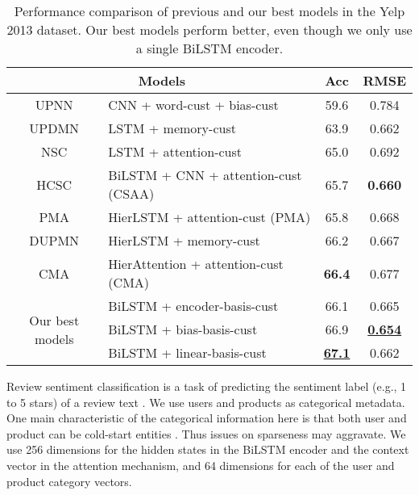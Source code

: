 \documentclass[11pt,a4paper]{article}
\begin{document}
\begin{table*}[t]
  \centering
    \begin{tabular}{|c|l|cc|}
    \hline
    \multicolumn{2}{|c|}{Models} & Acc   & RMSE \\
    \hline
    UPNN \cite{tang2015learning}  & CNN + word-cust + bias-cust & 59.6  & 0.784 \\
    UPDMN \cite{dou2017capturing} & LSTM + memory-cust & 63.9  & 0.662 \\
    NSC \cite{chen2016neural}  & LSTM + attention-cust & 65.0  & 0.692 \\
    HCSC \cite{amplayo2018cold} & BiLSTM + CNN + attention-cust (CSAA) & 65.7  & \textbf{0.660} \\
    PMA  \cite{pengcheng2017parallel} & HierLSTM + attention-cust (PMA) & 65.8  & 0.668 \\
    DUPMN \cite{long2018dual} & HierLSTM + memory-cust & 66.2  & 0.667 \\
    CMA \cite{ma2017cascading} & HierAttention + attention-cust (CMA) & \textbf{66.4} & 0.677 \\
    \hline
    \multicolumn{1}{|c|}{\multirow{3}[2]{*}{Our best models}} & BiLSTM + encoder-basis-cust & 66.1  & 0.665 \\
          & BiLSTM + bias-basis-cust & 66.9  & \textbf{\underline{0.654}} \\
          & BiLSTM + linear-basis-cust & \textbf{\underline{67.1}} & 0.662 \\
    \hline
    \end{tabular}\caption{Performance comparison of previous and our best models in the Yelp 2013 dataset. Our best models perform better, even though we only use a single BiLSTM encoder.}
  \label{tab:yelpresult}\end{table*}

Review sentiment classification is a task of predicting the sentiment label (e.g., 1 to 5 stars) of a review text \cite{pang2002thumbs}. We use users and products as categorical metadata. One main characteristic of the categorical information here is that both user and product can be cold-start entities \cite{amplayo2018cold}. Thus issues on sparseness may aggravate. We use 256 dimensions for the hidden states in the \mbox{BiLSTM} encoder and the context vector in the attention mechanism, and 64 dimensions for each of the user and product category vectors.
\end{document}
